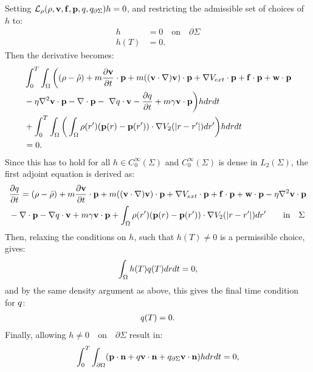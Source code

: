 Setting $\mathcal{L}_\rho(\rho,\mathbf{v},\mathbf{f},\mathbf{p},q,q_{\partial \Sigma})h=0$, and restricting the admissible set of choices of $h$ to:
\begin{align*}
h&=0 \quad \text{on} \quad \partial \Sigma\\
h(T)&=0.
\end{align*}
Then the derivative becomes:
\begin{align*}
 &\int_0^T \int_\Omega \bigg( (\rho - \hat {\rho}) +m  \frac{\partial \mathbf{v}}{\partial t}\cdot \mathbf{p} + m  ((\mathbf{v} \cdot \nabla)\mathbf{v} )\cdot \mathbf{p}+ \nabla V_{ext}\cdot \mathbf{p} + \mathbf{f} \cdot \mathbf{p} + \mathbf{w} \cdot \mathbf{p} \\
 &- \eta \nabla^2 \mathbf{v} \cdot \mathbf{p}  -\nabla\cdot \mathbf{p}  - \ \nabla q \cdot \mathbf{v}  -  \frac{\partial q}{\partial t} +m \gamma \mathbf{v} \cdot \mathbf{p} \bigg) h dr dt \\
 &+ \int_0^T \int_\Omega \bigg(  \int_\Omega  \rho(r')(\mathbf{p}(r) - \mathbf{p}(r')) \cdot\nabla V_2(|r-r'|)   dr'  \bigg)hdr dt\\
 &=0.
\end{align*}
Since this has to hold for all $h \in C_0^\infty(\Sigma)$ and $C_0^\infty(\Sigma)$ is dense in $L_2(\Sigma)$, the first adjoint equation is derived as:
\begin{align*}
& \frac{\partial q}{\partial t} = (\rho - \hat {\rho}) +m  \frac{\partial \mathbf{v}}{\partial t}\cdot \mathbf{p} + m ( (\mathbf{v} \cdot \nabla)\mathbf{v}) \cdot \mathbf{p}+ \nabla V_{ext}\cdot \mathbf{p} + \mathbf{f} \cdot \mathbf{p} + \mathbf{w} \cdot \mathbf{p}  - \eta \nabla^2 \mathbf{v} \cdot \mathbf{p} \\
&-\nabla\cdot \mathbf{p}  -  \nabla q \cdot \mathbf{v} + m \gamma \mathbf{v} \cdot \mathbf{p} + \int_\Omega  \rho(r')( \mathbf{p}(r) - \mathbf{p}(r') ) \cdot\nabla V_2(|r-r'|)   dr' \qquad \text{in} \quad \Sigma \notag
\end{align*}
Then, relaxing the conditions on $h$, such that $h(T) \neq 0$ is a permissible choice, gives:
\begin{align*}
\int_\Omega h(T) q(T) dr dt=0,
\end{align*}
and by the same density argument as above, this gives the final time condition for $q$:
\begin{align*}
q(T) = {0} .
\end{align*}
Finally, allowing $h \neq 0 \quad \text{on} \quad \partial \Sigma$ result in:
\begin{align*}
\int_0^T \int_{\partial \Omega} ( \mathbf{p} \cdot \mathbf{n}  +  q \mathbf{v} \cdot \mathbf{n}   +q_{\partial \Sigma} \mathbf{v} \cdot \mathbf{n})h  dr dt=0,
\end{align*}
